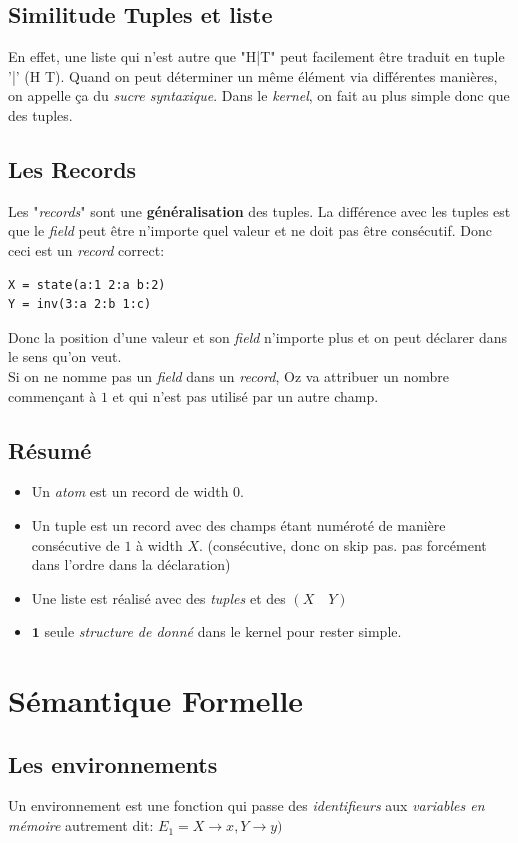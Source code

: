 \documentclass{report}
\begin{document}
\subsection{Similitude Tuples et liste}
En effet, une liste qui n'est autre que "H|T" peut facilement être traduit en tuple '|' (H T). Quand on peut déterminer un même élément via différentes manières, on appelle ça du \textit{sucre syntaxique}. Dans le \textit{kernel}, on fait au plus simple donc que des tuples.

\subsection{Les Records}
Les "\textit{records}" sont une \textbf{généralisation} des tuples. La différence avec les tuples est que le \textit{field} peut être n'importe quel valeur et ne doit pas être consécutif. Donc ceci est un \textit{record} correct:
\begin{lstlisting}
X = state(a:1 2:a b:2)
Y = inv(3:a 2:b 1:c)
\end{lstlisting}
Donc la position d'une valeur et son \textit{field} n'importe plus et on peut déclarer dans le sens qu'on veut.\\
Si on ne nomme pas un \textit{field} dans un \textit{record}, Oz va attribuer un nombre commençant à $1$ et qui n'est pas utilisé par un autre champ.\\
\subsection{Résumé}
\begin{itemize}
\item Un \textit{atom} est un record de width $0$.
\item Un tuple est un record avec des champs étant numéroté de manière consécutive de $1$ à width $X$. (consécutive, donc on skip pas. pas forcément dans l'ordre dans la déclaration)
\item Une liste est réalisé avec des \textit{tuples} et des $(X \quad Y)$
\item $\textbf{1}$ seule \textit{structure de donné} dans le kernel pour rester simple.
\end{itemize}

\section{Sémantique Formelle}
\subsection{Les environnements}
Un environnement est une fonction qui passe des \textit{identifieurs} aux \textit{variables en mémoire} autrement dit: $E_1 = {X \rightarrow x, Y \rightarrow y)}$
\end{document}

